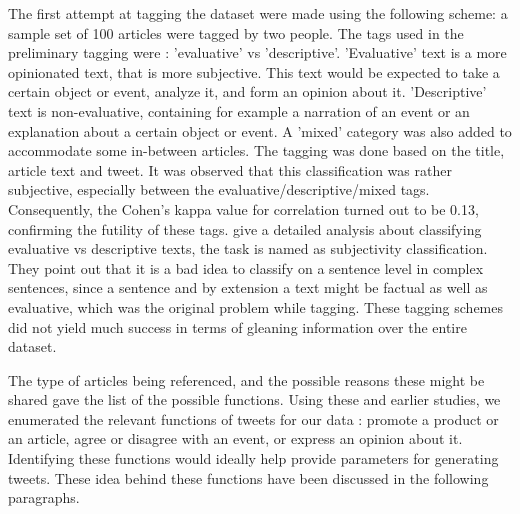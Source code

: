 The first attempt at tagging the dataset were made using the following scheme: a sample set of 100 articles were tagged by two people. The tags used in the preliminary tagging were : 'evaluative' vs 'descriptive'. 'Evaluative' text is a more opinionated text, that is more subjective. This text would be expected to take a certain object or event, analyze it,  and form an opinion about it. 'Descriptive' text is non-evaluative, containing for example a narration of an event or an explanation about a certain object or event. A 'mixed' category was also added to accommodate some in-between articles. The tagging was done based on the title, article text and tweet. It was observed that this classification was rather subjective, especially between the evaluative/descriptive/mixed tags. Consequently, the Cohen's kappa value for correlation turned out to be 0.13, confirming the futility of these tags. \cite{liu2012survey} give a detailed analysis about classifying evaluative vs descriptive texts, the task is named as subjectivity classification. They point out that it is a bad idea to classify on a sentence level in complex sentences, since a sentence and by extension a text might be factual as well as evaluative, which was the original problem while tagging. These tagging schemes did not yield much success in terms of gleaning information over the entire dataset.


The type of articles being referenced, and the possible reasons these might be shared gave the list of the possible functions. Using these and earlier studies, we enumerated the relevant functions of tweets for our data : promote a product or an article, agree or disagree with an event, or express an opinion about it. Identifying these functions would ideally help provide parameters for generating tweets. These idea behind these functions have been discussed in the following paragraphs. 

